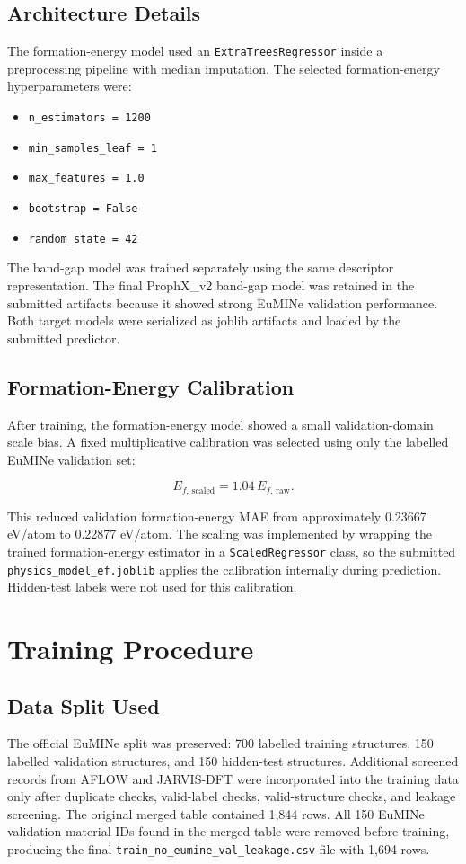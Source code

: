 \documentclass[10pt, a4paper]{article}
\begin{document}
\subsection{Architecture Details}
The formation-energy model used an \texttt{ExtraTreesRegressor} inside a preprocessing pipeline with median imputation. The selected formation-energy hyperparameters were:

\begin{itemize}
  \item \texttt{n\_estimators = 1200}
  \item \texttt{min\_samples\_leaf = 1}
  \item \texttt{max\_features = 1.0}
  \item \texttt{bootstrap = False}
  \item \texttt{random\_state = 42}
\end{itemize}

The band-gap model was trained separately using the same descriptor representation. The final ProphX\_v2 band-gap model was retained in the submitted artifacts because it showed strong EuMINe validation performance. Both target models were serialized as joblib artifacts and loaded by the submitted predictor.

\subsection{Formation-Energy Calibration}
After training, the formation-energy model showed a small validation-domain scale bias. A fixed multiplicative calibration was selected using only the labelled EuMINe validation set:

\[
E_{f,\,\mathrm{scaled}} = 1.04\,E_{f,\,\mathrm{raw}} .
\]

This reduced validation formation-energy MAE from approximately 0.23667 eV/atom to 0.22877 eV/atom. The scaling was implemented by wrapping the trained formation-energy estimator in a \texttt{ScaledRegressor} class, so the submitted \texttt{physics\_model\_ef.joblib} applies the calibration internally during prediction. Hidden-test labels were not used for this calibration.

\section{Training Procedure}

\subsection{Data Split Used}
The official EuMINe split was preserved: 700 labelled training structures, 150 labelled validation structures, and 150 hidden-test structures. Additional screened records from AFLOW and JARVIS-DFT were incorporated into the training data only after duplicate checks, valid-label checks, valid-structure checks, and leakage screening. The original merged table contained 1,844 rows. All 150 EuMINe validation material IDs found in the merged table were removed before training, producing the final \texttt{train\_no\_eumine\_val\_leakage.csv} file with 1,694 rows.
\end{document}
